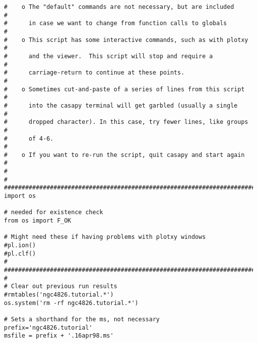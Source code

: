 \begin{verbatim}
#    o The "default" commands are not necessary, but are included        #
#      in case we want to change from function calls to globals          #
#    o This script has some interactive commands, such as with plotxy    #
#      and the viewer.  This script will stop and require a              #
#      carriage-return to continue at these points.                      #
#    o Sometimes cut-and-paste of a series of lines from this script     #
#      into the casapy terminal will get garbled (usually a single       #
#      dropped character). In this case, try fewer lines, like groups    #
#      of 4-6.                                                           #
#    o If you want to re-run the script, quit casapy and start again     #
#                                                                        #
##########################################################################
import os

# needed for existence check
from os import F_OK

# Might need these if having problems with plotxy windows
#pl.ion()
#pl.clf()
#
##########################################################################
#                                                                        
# Clear out previous run results
#rmtables('ngc4826.tutorial.*')
os.system('rm -rf ngc4826.tutorial.*')

# Sets a shorthand for the ms, not necessary
prefix='ngc4826.tutorial'
msfile = prefix + '.16apr98.ms'


\end{verbatim}
